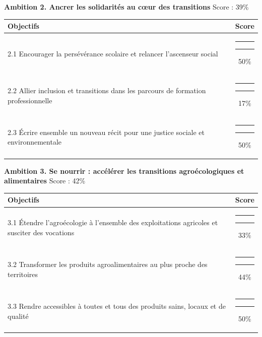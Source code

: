\documentclass[
]{article}
\begin{document}
\needspace{8cm}
\vspace{0.8cm}

\textbf{\fontsize{10pt}{12pt}\selectfont Ambition 2. Ancrer les solidarités au cœur des transitions}
\hfill \small Score : 39\%

\begin{center}
\begin{tabular}{p{10cm}c}
\toprule
Objectifs & Score \\
\midrule
2.1 Encourager la persévérance scolaire et relancer l’ascenseur social & {\color[HTML]{6E9E62}\rule{3cm}{3pt}}{\color{gray}\rule{3cm}{3pt}}\hspace{0.3cm}50\% \\
2.2 Allier inclusion et transitions dans les parcours de formation professionnelle & {\color[HTML]{CC1414}\rule{1.02cm}{3pt}}{\color{gray}\rule{4.98cm}{3pt}}\hspace{0.3cm}17\% \\
2.3 Écrire ensemble un nouveau récit pour une justice sociale et environnementale & {\color[HTML]{6E9E62}\rule{3cm}{3pt}}{\color{gray}\rule{3cm}{3pt}}\hspace{0.3cm}50\% \\
\bottomrule
\end{tabular}
\end{center}

\needspace{8cm}
\vspace{0.8cm}

\textbf{\fontsize{10pt}{12pt}\selectfont Ambition 3. Se nourrir : accélérer les transitions agroécologiques et alimentaires}
\hfill \small Score : 42\%

\begin{center}
\begin{tabular}{p{10cm}c}
\toprule
Objectifs & Score \\
\midrule
3.1 Étendre l’agroécologie à l’ensemble des exploitations agricoles et susciter des vocations & {\color[HTML]{EB6E26}\rule{1.98cm}{3pt}}{\color{gray}\rule{4.02cm}{3pt}}\hspace{0.3cm}33\% \\
3.2 Transformer les produits agroalimentaires au plus proche des territoires & {\color[HTML]{EB6E26}\rule{2.64cm}{3pt}}{\color{gray}\rule{3.36cm}{3pt}}\hspace{0.3cm}44\% \\
3.3 Rendre accessibles à toutes et tous des produits sains, locaux et de qualité & {\color[HTML]{6E9E62}\rule{3cm}{3pt}}{\color{gray}\rule{3cm}{3pt}}\hspace{0.3cm}50\% \\
\bottomrule
\end{tabular}
\end{center}
\end{document}
